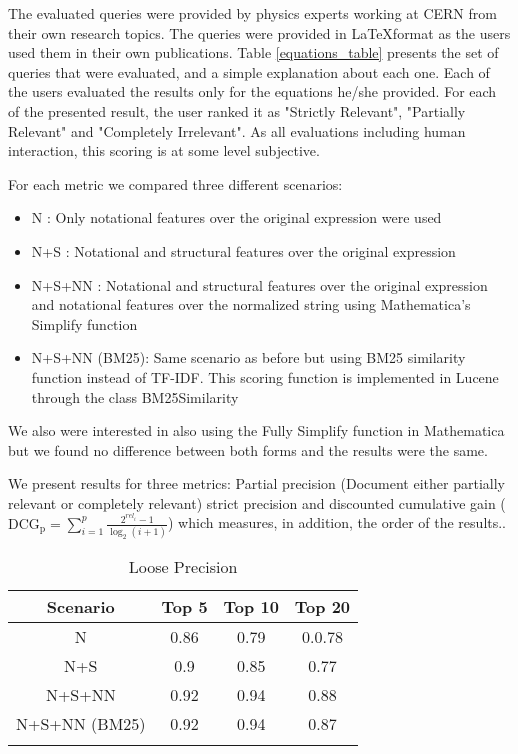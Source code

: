 The evaluated queries were provided by physics experts working at CERN from their own research topics. The queries were provided in \LaTeX format as the users used them in their own publications.
Table \ref{equations_table} presents the set of queries that were evaluated, and a simple explanation about each one. 
Each of the users evaluated the results only for the equations he/she provided. For each of the presented result, the user ranked it as "Strictly Relevant", "Partially Relevant" and "Completely Irrelevant". As all evaluations including human interaction, this scoring is at some level subjective. 

For each metric we compared three different scenarios:

\begin{itemize}
\item N : Only notational features over the original expression were used
\item N+S : Notational and structural features over the original expression
\item N+S+NN : Notational and structural features over the original expression and notational features over the normalized string using Mathematica's Simplify function
\item N+S+NN (BM25): Same scenario as before but using BM25 similarity function instead of TF-IDF. This scoring function is implemented in Lucene through the class {\codefont BM25Similarity}
\end{itemize}

We also were interested in also using the Fully Simplify function in Mathematica but we found no difference between both forms and the results were the same.

We present results for three metrics: Partial precision (Document either partially relevant or completely relevant) strict precision and discounted cumulative gain ($ \mathrm{DCG_{p}} = \sum_{i=1}^{p} \frac{ 2^{rel_{i}} - 1 }{ \log_{2}(i+1)} $) which measures, in addition, the order of the results..


\begin{longtable}{|c|c|c|c|}
\hline 
\textbf{Scenario} & \textbf{Top 5} & \textbf{Top 10} & \textbf{Top 20} \\ 
\hline 
N & 0.86 & 0.79 & 0.0.78 \\ 
\hline 
N+S & 0.9 & 0.85 & 0.77 \\ 
\hline 
N+S+NN & 0.92 & 0.94 & 0.88 \\ 
\hline
N+S+NN (BM25) & 0.92 & 0.94 & 0.87 \\ 
\hline
 
\caption{Loose Precision}
\label{loose_precision}
\end{longtable} 


